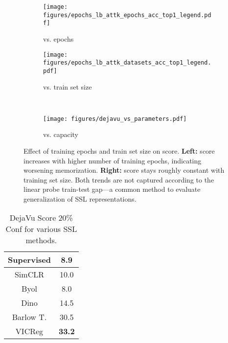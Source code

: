 \begin{figure}[ht]
\begin{minipage}[t]{0.49\textwidth}
\centering
     \begin{subfigure}[b]{0.49\textwidth}
         \centering
         \texttt{[image: figures/epochs\_lb\_attk\_epochs\_acc\_top1\_legend.pdf]}
         \caption{\dejavu vs. epochs}
         \label{fig:dejavu v. training epochs}
     \end{subfigure}
     \begin{subfigure}[b]{0.49\textwidth}
         \centering
         \texttt{[image: figures/epochs\_lb\_attk\_datasets\_acc\_top1\_legend.pdf]}
         \caption{\dejavu vs. train set size}
         \label{fig:dejavu v. n}
     \end{subfigure}~
     \begin{subfigure}[b]{0.32\textwidth}
         \centering
         \texttt{[image: figures/dejavu\_vs\_parameters.pdf]}
         \caption{\dejavu vs. capacity}
         \label{fig:dejavu v. n}
     \end{subfigure}
    \caption{
    Effect of training epochs and train set size on \dejavu score.
    \textbf{Left:} \dejavu score increases with higher number of training epochs, indicating worsening memorization.
    \textbf{Right:} \dejavu score stays roughly constant with training set size. Both trends are not captured according to the linear probe train-test gap---a common method to evaluate generalization of SSL representations.}
    \end{minipage}
\vspace{-1em} 
\end{figure}

\begin{table}[ht]
  \footnotesize
  \centering
  \begin{tabular}{|c|c|}
    \hline
    Supervised & 8.9\\
    \hline
    SimCLR\citep{chen2020simclr} & 10.0\\
    \hline
    Byol\citep{grill2020byol} & 8.0\\
    \hline
    Dino\citep{Dino} & 14.5\\
    \hline
    Barlow T.\citep{zbontar2021barlow} & 30.5\\
    \hline
    VICReg\citep{vicreg} & \textbf{33.2}\\
    \hline
  \end{tabular}
  \caption{DejaVu Score 20\% Conf for various SSL methods.}
  \label{tab:two-row-table}
\end{table}
\vspace{-1em} 
\fi


